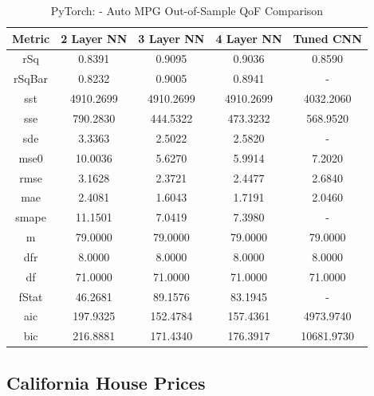 \documentclass{article}
\begin{document}
\begin{table}[H]
\centering
\caption{PyTorch: - Auto MPG Out-of-Sample QoF Comparison}
\label{tab:PyTorch: - Auto MPG Out-of-Sample QoF Comparison}
\begin{tabular}{|c|c|c|c|c|} \hline
Metric & 2 Layer NN & 3 Layer NN & 4 Layer NN & Tuned CNN \\ \hline \hline
rSq & 0.8391 & 0.9095 & 0.9036 & 0.8590 \\ \hline
rSqBar & 0.8232 & 0.9005 & 0.8941 & - \\ \hline
sst & 4910.2699 & 4910.2699 & 4910.2699 & 4032.2060 \\ \hline
sse & 790.2830 & 444.5322 & 473.3232 & 568.9520 \\ \hline
sde & 3.3363 & 2.5022 & 2.5820 & - \\ \hline
mse0 & 10.0036 & 5.6270 & 5.9914 & 7.2020 \\ \hline
rmse & 3.1628 & 2.3721 & 2.4477 & 2.6840 \\ \hline
mae & 2.4081 & 1.6043 & 1.7191 & 2.0460 \\ \hline
smape & 11.1501 & 7.0419 & 7.3980 & - \\ \hline
m & 79.0000 & 79.0000 & 79.0000 & 79.0000 \\ \hline
dfr & 8.0000 & 8.0000 & 8.0000 & 8.0000 \\ \hline
df & 71.0000 & 71.0000 & 71.0000 & 71.0000 \\ \hline
fStat & 46.2681 & 89.1576 & 83.1945 & - \\ \hline
aic & 197.9325 & 152.4784 & 157.4361 & 4973.9740 \\ \hline
bic & 216.8881 & 171.4340 & 176.3917 & 10681.9730 \\ \hline
\end{tabular}
\end{table}

\subsection{California House Prices}
\end{document}
